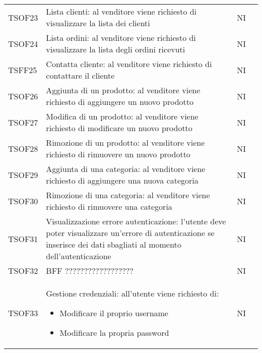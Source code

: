 \begin{center}
\begin{longtable}[!h]{p{50px} p{245px} p{75px} p{50px}}
TSOF23                           & Lista clienti: al venditore viene richiesto di visualizzare la lista dei clienti                                                                 & NI             \\
TSOF24                           & Lista ordini: al venditore viene richiesto di visualizzare la lista degli ordini ricevuti                                                        & NI             \\
TSFF25                           & Contatta cliente: al venditore viene richiesto di contattare il cliente                                                                          & NI             \\
TSOF26                           & Aggiunta di un prodotto: al venditore viene richiesto di aggiungere un nuovo prodotto                                                            & NI             \\
TSOF27                           & Modifica di un prodotto: al venditore viene richiesto di modificare un nuovo prodotto                                                            & NI             \\
TSOF28                           & Rimozione di un prodotto: al venditore viene richiesto di rimuovere un nuovo prodotto                                                            & NI             \\
TSOF29                           & Aggiunta di una categoria: al venditore viene richiesto di aggiungere una nuova categoria                                                                    & NI             \\
TSOF30                           & Rimozione di una categoria: al venditore viene richiesto di rimuovere una categoria                                                                    & NI             \\
TSOF31                           & Visualizzazione errore autenticazione: l'utente deve poter visualizzare un'errore di autenticazione se inserisce dei dati sbagliati al momento dell'autenticazione                                                                   & NI             \\
TSOF32                           & BFF ??????????????????                                                                    & NI             \\
TSOF33                           & Gestione credenziali: all'utente viene richiesto di: \begin{itemize} \item Modificare il proprio username \item Modificare la propria password\end{itemize}                                                                   & NI             \\


\end{longtable}
\end{center}